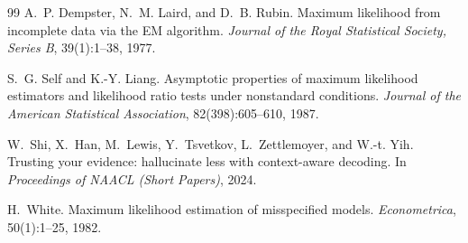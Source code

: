 \documentclass[11pt]{article}
\theoremstyle{definition}
\theoremstyle{remark}
\begin{document}
\begin{thebibliography}{99}
A.~P. Dempster, N.~M. Laird, and D.~B. Rubin.
\newblock Maximum likelihood from incomplete data via the {EM} algorithm.
\newblock \emph{Journal of the Royal Statistical Society, Series B}, 39(1):1--38, 1977.

S.~G. Self and K.-Y. Liang.
\newblock Asymptotic properties of maximum likelihood estimators and likelihood ratio tests under nonstandard conditions.
\newblock \emph{Journal of the American Statistical Association}, 82(398):605--610, 1987.

W.~Shi, X.~Han, M.~Lewis, Y.~Tsvetkov, L.~Zettlemoyer, and W.-t. Yih.
\newblock Trusting your evidence: hallucinate less with context-aware decoding.
\newblock In \emph{Proceedings of NAACL (Short Papers)}, 2024.

H.~White.
\newblock Maximum likelihood estimation of misspecified models.
\newblock \emph{Econometrica}, 50(1):1--25, 1982.

\end{thebibliography}
\end{document}

